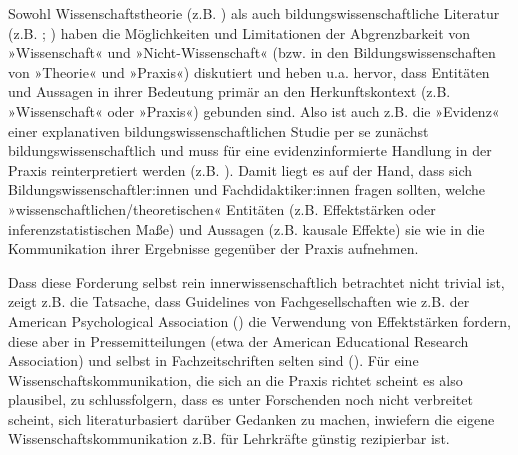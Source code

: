 \documentclass[
  jou,
  floatsintext,
  longtable,
  nolmodern,
  notxfonts,
  notimes,
  colorlinks=true,linkcolor=blue,citecolor=blue,urlcolor=blue]{apa7}
\begin{document}
Sowohl Wissenschaftstheorie (z.B. ) als auch bildungswissenschaftliche Literatur (z.B.
;
) haben die Möglichkeiten und
Limitationen der Abgrenzbarkeit von »Wissenschaft« und
»Nicht-Wissenschaft« (bzw. in den Bildungswissenschaften von »Theorie«
und »Praxis«) diskutiert und heben u.a. hervor, dass Entitäten und
Aussagen in ihrer Bedeutung primär an den Herkunftskontext (z.B.
»Wissenschaft« oder »Praxis«) gebunden sind. Also ist auch z.B. die
»Evidenz« einer explanativen bildungswissenschaftlichen Studie per se
zunächst bildungswissenschaftlich und muss für eine evidenzinformierte
Handlung in der Praxis reinterpretiert werden (z.B.
). Damit liegt
es auf der Hand, dass sich Bildungswissenschaftler:innen und
Fachdidaktiker:innen fragen sollten, welche
»wissenschaftlichen/theoretischen« Entitäten (z.B. Effektstärken oder
inferenzstatistischen Maße) und Aussagen (z.B. kausale Effekte) sie wie
in die Kommunikation ihrer Ergebnisse gegenüber der Praxis aufnehmen.

Dass diese Forderung selbst rein innerwissenschaftlich betrachtet nicht
trivial ist, zeigt z.B. die Tatsache, dass Guidelines von
Fachgesellschaften wie z.B. der American Psychological Association
() die
Verwendung von Effektstärken fordern, diese aber in Pressemitteilungen
(etwa der American Educational Research Association) und selbst in
Fachzeitschriften selten sind (). Für eine Wissenschaftskommunikation, die sich an die
Praxis richtet scheint es also plausibel, zu schlussfolgern, dass es
unter Forschenden noch nicht verbreitet scheint, sich literaturbasiert
darüber Gedanken zu machen, inwiefern die eigene
Wissenschaftskommunikation z.B. für Lehrkräfte günstig rezipierbar ist.
\end{document}
